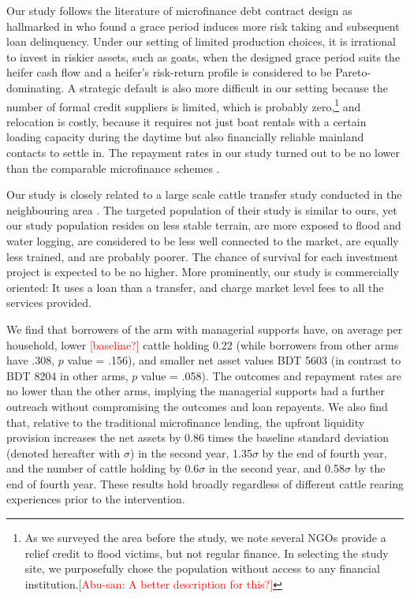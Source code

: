 	Our study follows the literature of microfinance debt contract design as hallmarked in \citet{Field2013} who found a grace period induces more risk taking and subsequent loan delinquency. Under our setting of limited production choices, it is irrational to invest in riskier assets, such as goats, when the designed grace period suits the heifer cash flow and a heifer's risk-return profile is considered to be Pareto-dominating. A strategic default is also more difficult in our setting because the number of formal credit suppliers is limited, which is probably zero,\footnote{As we surveyed the area before the study, we note several NGOs provide a relief credit to flood victims, but not regular finance. In selecting the study site, we purposefully chose the population without access to any financial institution.\textcolor{red}{[Abu-san: A better description for this?]} } and relocation is costly, because it requires not just boat rentals with a certain loading capacity during the daytime but also financially reliable mainland contacts to settle in. The repayment rates in our study turned out to be no lower than the comparable microfinance schemes \citep{BanerjeeKarlanZinman2015}.

	Our study is closely related to a large scale cattle transfer study conducted in the neighbouring area \citep{BandieraBRAC2017, Balboni2020}. The targeted population of their study is similar to ours, yet our study population resides on less stable terrain, are more exposed to flood and water logging, are considered to be less well connected to the market, are equally less trained, and are probably poorer. The chance of survival for each investment project is expected to be no higher. More prominently, our study is commercially oriented: It uses a loan than a transfer, and charge market level fees to all the services provided. 
	



	We find that borrowers of the arm with managerial supports have, on average per household, lower \textcolor{red}{[baseline?]} cattle holding 0.22 (while borrowers from other arms have .308, $p$ value = .156), and smaller net asset values BDT 5603 (in contrast to BDT 8204 in other arms, $p$ value = .058). The outcomes and repayment rates are no lower than the other arms, implying the managerial supports had a further outreach without compromising the outcomes and loan repayents. We also find that, relative to the traditional microfinance lending, the upfront liquidity provision increases the net assets by 
	0.86 times the baseline standard deviation (denoted hereafter with $\sigma$) in the second year, 
	1.35$\sigma$ by the end of fourth year, 
	and the number of cattle holding by 0.6$\sigma$ in the second year, and 
	0.58$\sigma$ by the end of fourth year. 
	These results hold broadly regardless of different cattle rearing experiences prior to the intervention.

